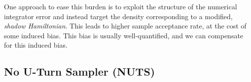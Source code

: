     One approach to ease this burden is to exploit the structure of the numerical integrator error and instead target the density corresponding to a modified, \textit{shadow Hamiltonian}. This leads to higher sample acceptance rate, at the cost of some induced bias. This bias is usually well-quantified, and we can compensate for this induced bias. 

  \subsection{No U-Turn Sampler (NUTS)}

